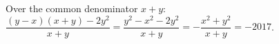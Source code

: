 Over the common denominator $x+y$: $\dfrac{(y-x)(x+y)-2y^2}{x+y}=\dfrac{y^2-x^2-2y^2}{x+y}=-\dfrac{x^2+y^2}{x+y}=\boxed{-2017}$.
